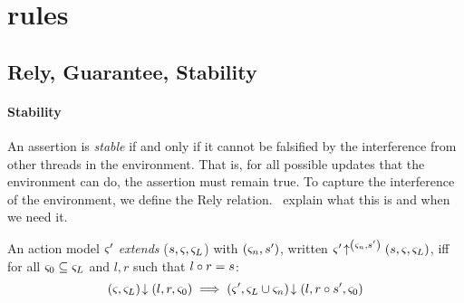 \section{\colosl rules}

\subsection{Rely, Guarantee, Stability}
%
%
\paragraph{Stability}
An assertion is \emph{stable} if and only if it cannot be falsified by the interference from other threads in the environment. That is, for all possible updates that the environment can do, the assertion must remain true. To capture the interference of the environment, we define the Rely relation.
%
%
\todo\ explain what this is and when we need it.
\begin{definition}
An action model $\varsigma_{}'$ \emph{extends}  ($s, \varsigma_{}, \varsigma_{L}$) with $(\varsigma_{n}, s')$, written $\varsigma_{}' \!\uparrow^{\left(\varsigma_{n}, s'\right)} \left(s, \varsigma_{}, \varsigma_{L}\right)$, iff for all $\varsigma_{0} \subseteq \varsigma_{L}$ and $l, r$ such that $l \circ r = s$:
%
\[
	\left(\varsigma_{}, \varsigma_{L}\right) \!\downarrow \left(l, r, \varsigma_{0}\right) \implies \left(\varsigma_{}', \varsigma_{L} \cup \varsigma_{n}\right) \!\downarrow \left(l, r\circ s', \varsigma_{0}\right)
\]
%
\end{definition}
%
%
